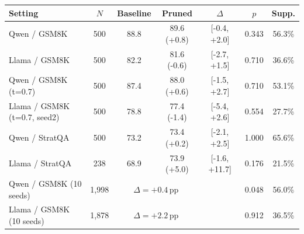 \begin{tabular}{lcccccc}
\toprule
\textbf{Setting} & $N$ & \textbf{Baseline} & \textbf{Pruned} & $\Delta$ & $p$ & \textbf{Supp.} \\
\midrule
Qwen / GSM8K & 500 & 88.8 & 89.6 (+0.8) & [-0.4, +2.0] & 0.343 & 56.3\% \\
Llama / GSM8K & 500 & 82.2 & 81.6 (-0.6) & [-2.7, +1.5] & 0.710 & 36.6\% \\
Qwen / GSM8K (t=0.7) & 500 & 87.4 & 88.0 (+0.6) & [-1.5, +2.7] & 0.710 & 53.1\% \\
Llama / GSM8K (t=0.7, seed2) & 500 & 78.8 & 77.4 (-1.4) & [-5.4, +2.6] & 0.554 & 27.7\% \\
Qwen / StratQA & 500 & 73.2 & 73.4 (+0.2) & [-2.1, +2.5] & 1.000 & 65.6\% \\
Llama / StratQA & 238 & 68.9 & 73.9 (+5.0) & [-1.6, +11.7] & 0.176 & 21.5\% \\
Qwen / GSM8K (10 seeds) & 1,998 & \multicolumn{2}{c}{$\Delta = +0.4$\,pp} & & 0.048 & 56.0\% \\
Llama / GSM8K (10 seeds) & 1,878 & \multicolumn{2}{c}{$\Delta = +2.2$\,pp} & & 0.912 & 36.5\% \\
\bottomrule
\end{tabular}